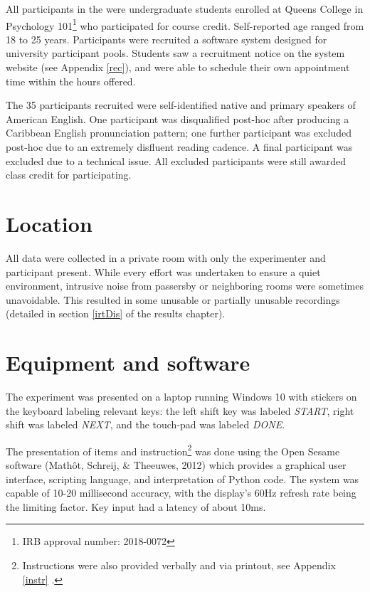 \documentclass[12pt,oneside]{book}
\let\rmarkdownfootnote\footnote%
\def\footnote{\protect\rmarkdownfootnote}
\begin{document}
All participants in the  were undergraduate students enrolled at Queens College in Psychology 101\footnote{IRB approval number: 2018-0072} who participated for course credit. Self-reported age ranged from 18 to 25 years. Participants were recruited  a software system designed for university participant pools. Students saw a recruitment notice on the system website (see Appendix \ref{rec}), and were able to schedule their own appointment time within the hours offered.

The 35 participants recruited were self-identified native and primary speakers of American English. One participant was disqualified post-hoc after producing a Caribbean English pronunciation pattern; one further participant was excluded post-hoc due to an extremely disfluent reading cadence. A final participant was excluded due to a technical issue. All excluded participants were still awarded class credit for participating.

\hypertarget{location}{%
\section{Location}\label{location}}

All data were collected in a private room with only the experimenter and participant present. While every effort was undertaken to ensure a quiet environment, intrusive noise from passersby or neighboring rooms were sometimes unavoidable. This resulted in some unusable or partially unusable recordings (detailed in section \ref{irtDis} of the results chapter).

\hypertarget{equipment-and-software}{%
\section{Equipment and software}\label{equipment-and-software}}

The experiment was presented on a laptop running Windows 10 with stickers on the keyboard labeling relevant keys: the left shift key was labeled \emph{START}, right shift was labeled \emph{NEXT}, and the touch-pad was labeled \emph{DONE}.

The presentation of items and instruction\footnote{Instructions were also provided verbally and via printout, see Appendix \ref{instr} .} was done using the Open Sesame software (Mathôt, Schreij, \& Theeuwes, 2012) which provides a graphical user interface, scripting language, and interpretation of Python code. The system was capable of 10-20 millisecond accuracy, with the display's 60Hz refresh rate being the limiting factor. Key input had a latency of about 10ms.
\end{document}
